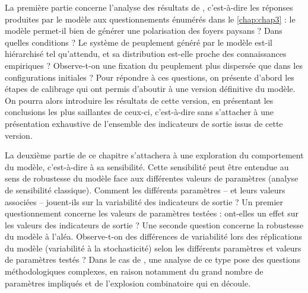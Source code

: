 La première partie concerne l'analyse des \og résultats\fg{} de \simfeodal{}, c'est-à-dire les réponses produites par le modèle aux questionnements énumérés dans le \cref{chap:chap3} :
le modèle permet-il bien de générer une polarisation des foyers paysans ? Dans quelles conditions ?
Le système de peuplement généré par le modèle est-il hiérarchisé tel qu'attendu, et sa distribution est-elle proche des connaissances empiriques ?
Observe-t-on une fixation du peuplement plus dispersée que dans les configurations initiales ?
Pour répondre à ces questions, on présente d'abord les étapes de calibrage qui ont permis d'aboutir à une version \og définitive\fg{} du modèle.
On pourra alors introduire les résultats de cette version, en présentant les conclusions les plus saillantes de ceux-ci, c'est-à-dire sans s'attacher à une présentation exhaustive de l'ensemble des indicateurs de sortie issus de cette version.

La deuxième partie de ce chapitre s'attachera à une exploration du comportement du modèle, c'est-à-dire à sa sensibilité.
Cette sensibilité peut être entendue au sens de robustesse du modèle face aux différentes valeurs de paramètres (analyse de sensibilité classique).
Comment les différents paramètres -- et leurs valeurs associées -- jouent-ils sur la variabilité des indicateurs de sortie ?
Un premier questionnement concerne les valeurs de paramètres testées : ont-elles un effet sur les valeurs des indicateurs de sortie ?
Une seconde question concerne la robustesse du modèle à l'aléa.
Observe-t-on des différences de variabilité lors des réplications du modèle (variabilité à la stochasticité) selon les différents paramètres et valeurs de paramètres testés ?
Dans le cas de \simfeodal{}, une analyse de ce type pose des questions méthodologiques complexes, en raison notamment du grand nombre de paramètres impliqués et de \og l'explosion combinatoire\fg{} qui en découle.


